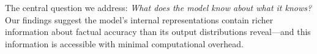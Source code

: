 The central question we address: \emph{What does the model know about what it knows?} Our findings suggest the model's internal representations contain richer information about factual accuracy than its output distributions reveal---and this information is accessible with minimal computational overhead.
